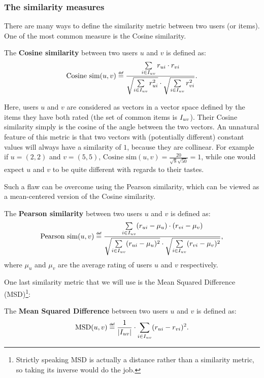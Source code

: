 \subsubsection{The similarity measures}
\label{SEC:similarity_measures}

There are  many ways to define the similarity metric between two users (or
items).
One of the most common measure is the Cosine similarity.

\begin{definition}
  The \textbf{Cosine similarity} between two users $u$ and $v$ is defined as:
$$
\text{Cosine sim}(u, v) \eqdef \frac{ \sum\limits_{i \in \Iuv} \rui \cdot \rvi}
{\sqrt{\sum\limits_{i \in \Iuv} \rui^2} \cdot \sqrt{\sum\limits_{i \in \Iuv}
\rvi^2}}.
$$
\end{definition}

Here, users $u$ and $v$ are considered as vectors in a vector space defined by
the items they have both rated (the set of common items is $I_{uv}$). Their
Cosine similarity simply is the cosine of the angle between the two vectors. An
unnatural feature of this metric is that two vectors with (potentially
different) constant values will always have a similarity of $1$, because they
are collinear. For example if $u = (2, 2)$ and $v = (5, 5)$, $\text{Cosine
sim}(u, v) = \frac{20}{\sqrt{8}\sqrt{50}} = 1$, while one would expect $u$ and
$v$ to be quite different with regards to their tastes.

Such a flaw can be overcome using the Pearson similarity, which can be viewed as
a mean-centered version of the Cosine similarity.

\begin{definition}
  The \textbf{Pearson similarity} between two users $u$ and $v$ is defined as:
$$
\text{Pearson sim}(u, v) \eqdef \frac{ \sum\limits_{i \in \Iuv}
(\rui -  \mu_u) \cdot (\rvi - \mu_{v})} {\sqrt{\sum\limits_{i
\in \Iuv} (\rui -  \mu_u)^2} \cdot \sqrt{\sum\limits_{i \in
\Iuv} (\rvi -  \mu_{v})^2}},
$$
where $\mu_u$ and $\mu_v$ are the average rating of users $u$ and $v$
respectively.
\end{definition}

One last similarity metric that we will use is the Mean Squared Difference
(MSD)\footnote{Strictly speaking MSD is actually a distance rather than a
similarity metric, so taking its inverse would do the job.}:
\begin{definition}
  The \textbf{Mean Squared Difference} between two users $u$ and $v$ is defined as:
$$\text{MSD}(u, v) \eqdef \frac{1}{|\Iuv|} \cdot \sum\limits_{i \in \Iuv} (\rui
- \rvi)^2.$$
\end{definition}

